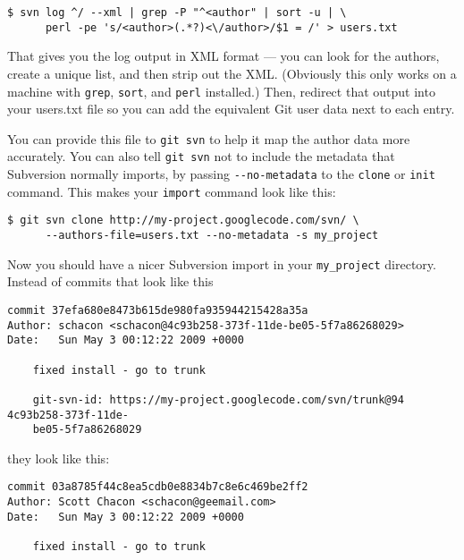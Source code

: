 \documentclass[a4paper]{book}
\begin{document}
\begin{shaded}\begin{verbatim}
$ svn log ^/ --xml | grep -P "^<author" | sort -u | \
      perl -pe 's/<author>(.*?)<\/author>/$1 = /' > users.txt
\end{verbatim}\end{shaded}

That gives you the log output in XML format --- you can look for the authors, create a unique list, and then strip out the XML. (Obviously this only works on a machine with \texttt{grep}, \texttt{sort}, and \texttt{perl} installed.) Then, redirect that output into your users.txt file so you can add the equivalent Git user data next to each entry.

You can provide this file to \texttt{git svn} to help it map the author data more accurately. You can also tell \texttt{git svn} not to include the metadata that Subversion normally imports, by passing \texttt{-{}-no-metadata} to the \texttt{clone} or \texttt{init} command. This makes your \texttt{import} command look like this:

\begin{shaded}\begin{verbatim}
$ git svn clone http://my-project.googlecode.com/svn/ \
      --authors-file=users.txt --no-metadata -s my_project
\end{verbatim}\end{shaded}

Now you should have a nicer Subversion import in your \texttt{my\_project} directory. Instead of commits that look like this

\begin{shaded}\begin{verbatim}
commit 37efa680e8473b615de980fa935944215428a35a
Author: schacon <schacon@4c93b258-373f-11de-be05-5f7a86268029>
Date:   Sun May 3 00:12:22 2009 +0000

    fixed install - go to trunk

    git-svn-id: https://my-project.googlecode.com/svn/trunk@94 4c93b258-373f-11de-
    be05-5f7a86268029
\end{verbatim}\end{shaded}

they look like this:

\begin{shaded}\begin{verbatim}
commit 03a8785f44c8ea5cdb0e8834b7c8e6c469be2ff2
Author: Scott Chacon <schacon@geemail.com>
Date:   Sun May 3 00:12:22 2009 +0000

    fixed install - go to trunk
\end{verbatim}\end{shaded}
\end{document}
